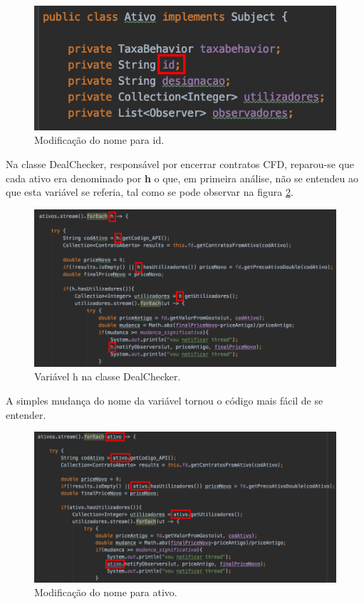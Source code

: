 \begin{figure}[H]
	\centering
	\includegraphics[scale=0.55]{images/change_variable_name_after.png}
	\caption{Modificação do nome para id.}
	\label{img:pag}
\end{figure}

\hspace{5mm} Na classe DealChecker, responsável por encerrar contratos CFD, reparou-se que cada ativo era denominado por \textbf{h} o que, em primeira análise, não se entendeu ao que esta variável se referia, tal como se pode observar na figura \ref{img:pag8}.

\begin{figure}[H]
	\centering
	\includegraphics[scale=0.55]{images/change_variable_name_before_2.png}
	\caption{Variável h na classe DealChecker.}
	\label{img:pag8}
\end{figure}

\hspace{5mm} A simples mudança do nome da variável tornou o código mais fácil de se entender.

\begin{figure}[H]
	\centering
	\includegraphics[scale=0.55]{images/change_variable_name_after_2.png}
	\caption{Modificação do nome para ativo.}
	\label{img:pag}
\end{figure}

